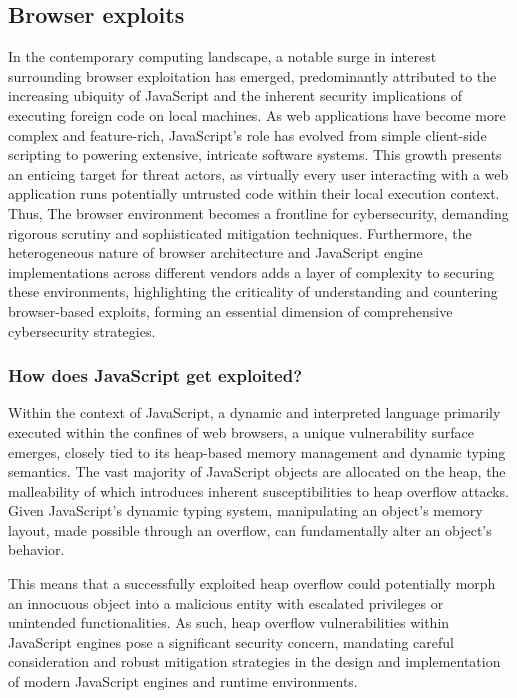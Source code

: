 \documentclass{article}
\begin{document}
\subsection{Browser exploits}
In the contemporary computing landscape, a notable surge in interest surrounding browser exploitation has emerged, predominantly attributed to the increasing ubiquity of JavaScript and the inherent security implications of executing foreign code on local machines. As web applications have become more complex and feature-rich, JavaScript's role has evolved from simple client-side scripting to powering extensive, intricate software systems. This growth presents an enticing target for threat actors, as virtually every user interacting with a web application runs potentially untrusted code within their local execution context. Thus, The browser environment becomes a frontline for cybersecurity, demanding rigorous scrutiny and sophisticated mitigation techniques. Furthermore, the heterogeneous nature of browser architecture and JavaScript engine implementations across different vendors adds a layer of complexity to securing these environments, highlighting the criticality of understanding and countering browser-based exploits, forming an essential dimension of comprehensive cybersecurity strategies.

\subsubsection{How does JavaScript get exploited?}
Within the context of JavaScript, a dynamic and interpreted language primarily executed within the confines of web browsers, a unique vulnerability surface emerges, closely tied to its heap-based memory management and dynamic typing semantics. The vast majority of JavaScript objects are allocated on the heap, the malleability of which introduces inherent susceptibilities to heap overflow attacks. Given JavaScript's dynamic typing system, manipulating an object's memory layout, made possible through an overflow, can fundamentally alter an object's behavior.


This means that a successfully exploited heap overflow could potentially morph an innocuous object into a malicious entity with escalated privileges or unintended functionalities. As such, heap overflow vulnerabilities within JavaScript engines pose a significant security concern, mandating careful consideration and robust mitigation strategies in the design and implementation of modern JavaScript engines and runtime environments.
\end{document}
